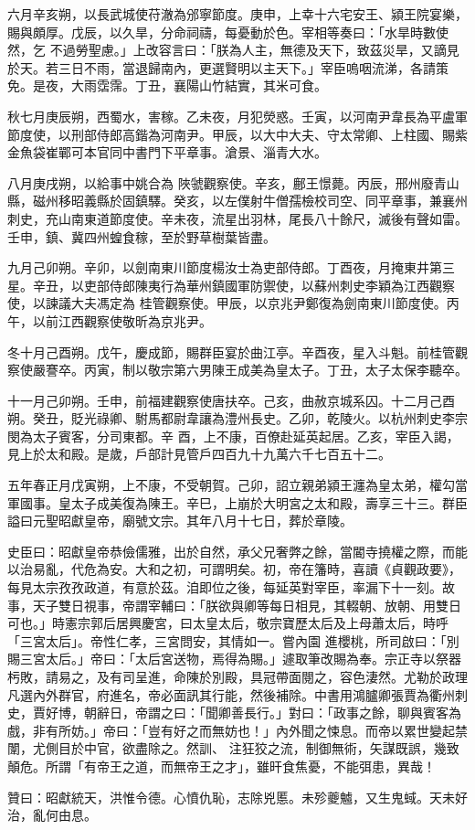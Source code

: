 \begin{pinyinscope}
 六月辛亥朔，以長武城使苻澈為邠寧節度。庚申，上幸十六宅安王、潁王院宴樂，賜與頗厚。戊辰，以久旱，分命祠禱，每憂動於色。宰相等奏曰：「水旱時數使然，乞
 不過勞聖慮。」上改容言曰：「朕為人主，無德及天下，致茲災旱，又謫見於天。若三日不雨，當退歸南內，更選賢明以主天下。」宰臣嗚咽流涕，各請策免。是夜，大雨霑霈。丁丑，襄陽山竹結實，其米可食。



 秋七月庚辰朔，西蜀水，害稼。乙未夜，月犯熒惑。壬寅，以河南尹韋長為平盧軍節度使，以刑部侍郎高鍇為河南尹。甲辰，以大中大夫、守太常卿、上柱國、賜紫金魚袋崔鄲可本官同中書門下平章事。滄景、淄青大水。



 八月庚戌朔，以給事中姚合為
 陜虢觀察使。辛亥，鄜王憬薨。丙辰，邢州廢青山縣，磁州移昭義縣於固鎮驛。癸亥，以左僕射牛僧孺檢校司空、同平章事，兼襄州刺史，充山南東道節度使。辛未夜，流星出羽林，尾長八十餘尺，滅後有聲如雷。壬申，鎮、冀四州蝗食稼，至於野草樹葉皆盡。



 九月己卯朔。辛卯，以劍南東川節度楊汝士為吏部侍郎。丁酉夜，月掩東井第三星。辛丑，以吏部侍郎陳夷行為華州鎮國軍防禦使，以蘇州刺史李穎為江西觀察使，以諫議大夫馮定為
 桂管觀察使。甲辰，以京兆尹鄭復為劍南東川節度使。丙午，以前江西觀察使敬昕為京兆尹。



 冬十月己酉朔。戊午，慶成節，賜群臣宴於曲江亭。辛酉夜，星入斗魁。前桂管觀察使嚴謇卒。丙寅，制以敬宗第六男陳王成美為皇太子。丁丑，太子太保李聽卒。



 十一月己卯朔。壬申，前福建觀察使唐扶卒。己亥，曲赦京城系囚。十二月己酉朔。癸丑，貶光祿卿、駙馬都尉韋讓為澧州長史。乙卯，乾陵火。以杭州刺史李宗閔為太子賓客，分司東都。辛
 酉，上不康，百僚赴延英起居。乙亥，宰臣入謁，見上於太和殿。是歲，戶部計見管戶四百九十九萬六千七百五十二。



 五年春正月戊寅朔，上不康，不受朝賀。己卯，詔立親弟潁王瀍為皇太弟，權勾當軍國事。皇太子成美復為陳王。辛巳，上崩於大明宮之太和殿，壽享三十三。群臣謚曰元聖昭獻皇帝，廟號文宗。其年八月十七日，葬於章陵。



 史臣曰：昭獻皇帝恭儉儒雅，出於自然，承父兄奢弊之餘，當閽寺撓權之際，而能以治易亂，代危為安。大和之初，可謂明矣。初，帝在籓時，喜讀《貞觀政要》，每見太宗孜孜政道，有意於茲。洎即位之後，每延英對宰臣，率漏下十一刻。故事，天子雙日視事，帝謂宰輔曰：「朕欲與卿等每日相見，其輟朝、放朝、用雙日可也。」時憲宗郭后居興慶宮，曰太皇太后，敬宗寶歷太后及上母蕭太后，時呼「三宮太后」。帝性仁孝，三宮問安，其情如一。嘗內園
 進櫻桃，所司啟曰：「別賜三宮太后。」帝曰：「太后宮送物，焉得為賜。」遽取筆改賜為奉。宗正寺以祭器杇敗，請易之，及有司呈進，命陳於別殿，具冠帶面閱之，容色淒然。尤勒於政理凡選內外群官，府進名，帝必面訊其行能，然後補除。中書用鴻臚卿張賈為衢州刺史，賈好博，朝辭日，帝謂之曰：「聞卿善長行。」對曰：「政事之餘，聊與賓客為戲，非有所妨。」帝曰：「豈有好之而無妨也！」內外聞之悚息。而帝以累世變起禁闈，尤側目於中官，欲盡除之。然訓、
 注狂狡之流，制御無術，矢謀既誤，幾致顛危。所謂「有帝王之道，而無帝王之才」，雖旰食焦憂，不能弭患，異哉！



 贊曰：昭獻統天，洪惟令德。心憤仇恥，志除兇慝。未殄夔魖，又生鬼蜮。天未好治，亂何由息。



\end{pinyinscope}